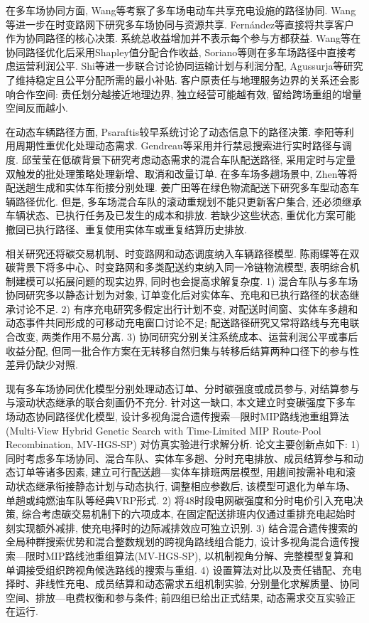 \documentclass{setp-new}
\begin{document}
在多车场协同方面, Wang等\cite{ref:7}考察了多车场电动车共享充电设施的路径协同.
Wang等\cite{ref:25}进一步在时变路网下研究多车场协同与资源共享.
Fern\'{a}ndez等\cite{ref:49}直接将共享客户作为协同路径的核心决策.
系统总收益增加并不表示每个参与方都获益.
Wang等\cite{ref:7}在协同路径优化后采用Shapley值分配合作收益,
Soriano等\cite{ref:8}则在多车场路径中直接考虑运营利润公平.
Shi等\cite{ref:9}进一步联合讨论协同运输计划与利润分配,
Agussurja等\cite{ref:10}研究了维持稳定且公平分配所需的最小补贴.
客户原责任与地理服务边界的关系还会影响合作空间:
责任划分越接近地理边界, 独立经营可能越有效,
留给跨场重组的增量空间反而越小.

在动态车辆路径方面, Psaraftis\cite{ref:14}较早系统讨论了动态信息下的路径决策.
李阳等\cite{ref:18}利用周期性重优化处理动态需求.
Gendreau等\cite{ref:22}采用并行禁忌搜索进行实时路径与调度.
邱莹莹\cite{ref:71}在低碳背景下研究考虑动态需求的混合车队配送路径,
采用定时与定量双触发的批处理策略处理新增、取消和改量订单.
在多车场多趟场景中, Zhen等\cite{ref:44}将配送趟生成和实体车衔接分别处理.
姜广田等\cite{ref:51}在绿色物流配送下研究多车型动态车辆路径优化.
但是, 多车场混合车队的滚动重规划不能只更新客户集合,
还必须继承车辆状态、已执行任务及已发生的成本和排放.
若缺少这些状态, 重优化方案可能撤回已执行路径、重复使用实体车或重复结算历史排放.

相关研究还将碳交易机制、时变路网和动态调度纳入车辆路径模型.
陈雨蝶等\cite{ref:48}在双碳背景下将多中心、时变路网和多类配送约束纳入同一冷链物流模型,
表明综合机制建模可以拓展问题的现实边界, 同时也会提高求解复杂度.
1) 混合车队与多车场协同研究多以静态计划为对象,
订单变化后对实体车、充电和已执行路径的状态继承讨论不足.
2) 有序充电研究多假定出行计划不变,
对配送时间窗、实体车多趟和动态事件共同形成的可移动充电窗口讨论不足;
配送路径研究又常将路线与充电联合改变, 两类作用不易分离.
3) 协同研究分别关注系统成本、运营利润公平或事后收益分配,
但同一批合作方案在无转移自然归集与转移后结算两种口径下的参与性差异仍缺少对照.

现有多车场协同优化模型分别处理动态订单、分时碳强度或成员参与,
对结算参与与滚动状态继承的联合刻画仍不充分.
针对这一缺口, 本文建立时变碳强度下多车场动态协同路径优化模型,
设计多视角混合遗传搜索—限时MIP路线池重组算法
(Multi-View Hybrid Genetic Search with Time-Limited MIP Route-Pool Recombination, MV-HGS-SP)
对仿真实验进行求解分析.
论文主要创新点如下:
1) 同时考虑多车场协同、混合车队、实体车多趟、分时充电排放、成员结算参与和动态订单等诸多因素,
建立可行配送趟—实体车排班两层模型,
用趟间按需补电和滚动状态继承衔接静态计划与动态执行,
调整相应参数后, 该模型可退化为单车场、单趟或纯燃油车队等经典VRP形式.
2) 将48时段电网碳强度和分时电价引入充电决策, 综合考虑碳交易机制下的六项成本,
在固定配送排班内仅通过重排充电起始时刻实现额外减排,
使充电择时的边际减排效应可独立识别.
3) 结合混合遗传搜索的全局种群搜索优势和混合整数规划的跨视角路线组合能力,
设计多视角混合遗传搜索—限时MIP路线池重组算法(MV-HGS-SP),
以机制视角分解、完整模型复算和单调接受组织跨视角候选路线的搜索与重组.
4) 设置算法对比以及责任错配、充电择时、非线性充电、成员结算和动态需求五组机制实验,
分别量化求解质量、协同空间、排放—电费权衡和参与条件; 前四组已给出正式结果, 动态需求交互实验正在运行.
\end{document}
